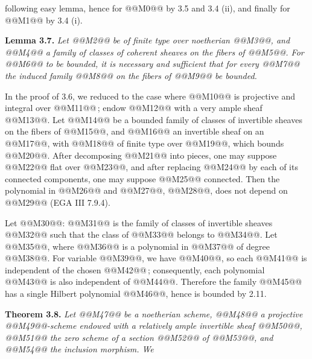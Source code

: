 following easy lemma, hence for @@M0@@ by 3.5 and 3.4 (ii), and finally for @@M1@@ by 3.4 (i).

\textbf{Lemma 3.7.} \emph{Let @@M2@@ be of finite type over noetherian @@M3@@, and @@M4@@ a family of classes of coherent sheaves on the fibers of @@M5@@. For @@M6@@ to be bounded, it is necessary and sufficient that for every @@M7@@ the induced family @@M8@@ on the fibers of @@M9@@ be bounded.}

In the proof of 3.6, we reduced to the case where @@M10@@ is projective and integral over @@M11@@\,; endow @@M12@@ with a very ample sheaf @@M13@@. Let @@M14@@ be a bounded family of classes of invertible sheaves on the fibers of @@M15@@, and @@M16@@ an invertible sheaf on an @@M17@@, with @@M18@@ of finite type over @@M19@@, which bounds @@M20@@. After decomposing @@M21@@ into pieces, one may suppose @@M22@@ flat over @@M23@@, and after replacing @@M24@@ by each of its connected components, one may suppose @@M25@@ connected. Then the polynomial in @@M26@@ and @@M27@@, @@M28@@, does not depend on @@M29@@ (EGA III 7.9.4).

Let @@M30@@: @@M31@@ is the family of classes of invertible sheaves @@M32@@ such that the class of @@M33@@ belongs to @@M34@@. Let @@M35@@, where @@M36@@ is a polynomial in @@M37@@ of degree @@M38@@. For variable @@M39@@, we have @@M40@@, so each @@M41@@ is independent of the chosen @@M42@@\,; consequently, each polynomial @@M43@@ is also independent of @@M44@@. Therefore the family @@M45@@ has a single Hilbert polynomial @@M46@@, hence is bounded by 2.11.

\textbf{Theorem 3.8.} \emph{Let @@M47@@ be a noetherian scheme, @@M48@@ a projective @@M49@@-scheme endowed with a relatively ample invertible sheaf @@M50@@, @@M51@@ the zero scheme of a section @@M52@@ of @@M53@@, and @@M54@@ the inclusion morphism. We}
